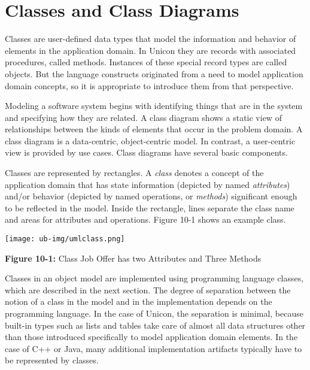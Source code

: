 \section{Classes and Class Diagrams}

Classes are user-defined data types that model the information and
behavior of elements in the application domain. In Unicon they are
records with associated procedures, called methods. Instances of these
special record types are called objects.  But the language constructs
originated from a need to model application domain concepts, so it is
appropriate to introduce them from that perspective.

Modeling a software system begins with identifying things
that are in the system and specifying how they are related. A class
diagram shows a static view of relationships between the kinds of
elements that occur in the problem domain. A class diagram is a
data-centric, object-centric model. In contrast, a
user-centric view is provided by use cases. Class
diagrams have several basic components.

Classes are represented by rectangles. A
{\em class\/} denotes a concept of the
application domain that has state information (depicted by named
\textit{attributes}) and/or behavior (depicted
by named operations, or \textit{methods}) significant
enough to be reflected in the model. Inside the rectangle, lines
separate the class name and areas for attributes and operations. Figure
10-1 shows an example class.

\bigskip

\texttt{[image: ub-img/umlclass.png]}

{\sffamily\bfseries Figure 10-1:}
{\sffamily Class Job Offer has two Attributes and Three Methods}

\bigskip

Classes in an object model are
implemented using programming language classes, which are described in
the next section. The degree of separation between the notion of a
class in the model and in the implementation depends on the programming
language. In the case of Unicon, the separation is minimal, because
built-in types such as lists and tables take care of almost all data
structures other than those introduced specifically to model
application domain elements. In the case of C++ or Java,
many additional implementation artifacts typically have to be
represented by classes.

